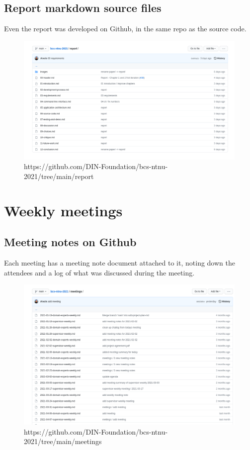 \subsection{Report markdown source files}

Even the report was developed on Github, in the same repo as the source code.

    \begin{figure}[htbp]
      \centering
      \includegraphics[width=.8\textwidth]{figures/github-report}
      \caption[Report]{https://github.com/DIN-Foundation/bcs-ntnu-2021/tree/main/report}
    \end{figure}


\section{Weekly meetings}

\subsection{Meeting notes on Github}

Each meeting has a meeting note document attached to it, noting down the attendees
and a log of what was discussed during the meeting.

    \begin{figure}[htbp]
      \centering
      \includegraphics[width=.7\textwidth]{figures/github-meetings}
      \caption[Meeting notes]{https://github.com/DIN-Foundation/bcs-ntnu-2021/tree/main/meetings}
    \end{figure}


